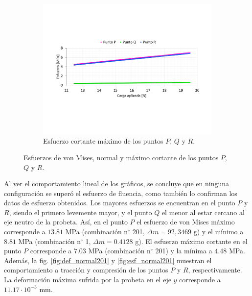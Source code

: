 \begin{figure}[p]
	\begin{subfigure}{1\linewidth}
		\centering
		\includegraphics[width=\linewidth, trim={1cm 5cm 0cm 5cm},clip]{Imagenes/esf_ms.pdf}
		\caption{Esfuerzo cortante máximo de los puntos $P$, $Q$ y $R$.}
		\label{fig:esf_ms201}
	\end{subfigure}
\caption{Esfuerzos de von Mises, normal y máximo cortante de los puntos $P$, $Q$ y $R$.}
\label{fig:esf_201}
\end{figure}

Al ver el comportamiento lineal de los gráficos, se concluye que en ninguna configuración se superó el esfuerzo de fluencia, como también lo confirman los datos de esfuerzo obtenidos. Los mayores esfuerzos se encuentran en el punto $P$ y $R$, siendo el primero levemente mayor, y el punto $Q$ el menor al estar cercano al eje neutro de la probeta. Así, en el punto $P$ el esfuerzo de von Mises máximo corresponde a $13.81$ MPa (combinación n$^{\circ}$ 201, $\Delta m = 92,3469$ g) y el mínimo a $8.81$ MPa (combinación n$^{\circ}$ 1, $\Delta m = 0.4128$ g). El esfuerzo máximo cortante en el punto $P$ corresponde a $7.03$ MPa (combinación n$^{\circ}$ 201) y la mínima a $4.48$ MPa. Además, la fig. \ref{fig:def_normal201} y \ref{fig:esf_normal201} muestran el comportamiento a tracción y compresión de los puntos $P$ y $R$, respectivamente. La deformación máxima sufrida por la probeta en el eje $y$ corresponde a $11.17\cdot 10^{-3}$ mm.


